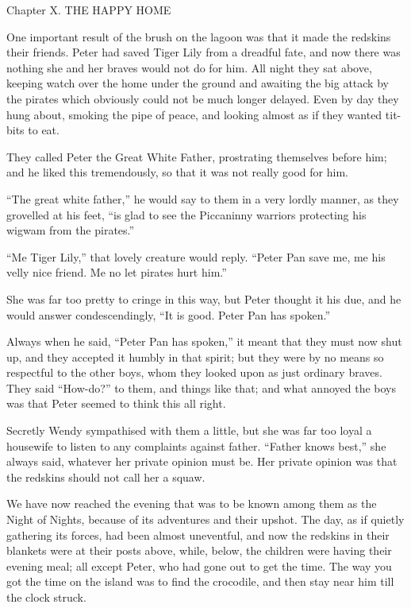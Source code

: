 Chapter X.
THE HAPPY HOME


One important result of the brush on the lagoon was that it made the
redskins their friends. Peter had saved Tiger Lily from a dreadful
fate, and now there was nothing she and her braves would not do for
him. All night they sat above, keeping watch over the home under the
ground and awaiting the big attack by the pirates which obviously could
not be much longer delayed. Even by day they hung about, smoking the
pipe of peace, and looking almost as if they wanted tit-bits to eat.

They called Peter the Great White Father, prostrating themselves before
him; and he liked this tremendously, so that it was not really good for
him.

``The great white father,'' he would say to them in a very lordly manner,
as they grovelled at his feet, ``is glad to see the Piccaninny warriors
protecting his wigwam from the pirates.''

``Me Tiger Lily,'' that lovely creature would reply. ``Peter Pan save me,
me his velly nice friend. Me no let pirates hurt him.''

She was far too pretty to cringe in this way, but Peter thought it his
due, and he would answer condescendingly, ``It is good. Peter Pan has
spoken.''

Always when he said, ``Peter Pan has spoken,'' it meant that they must
now shut up, and they accepted it humbly in that spirit; but they were
by no means so respectful to the other boys, whom they looked upon as
just ordinary braves. They said ``How-do?'' to them, and things like
that; and what annoyed the boys was that Peter seemed to think this all
right.

Secretly Wendy sympathised with them a little, but she was far too
loyal a housewife to listen to any complaints against father. ``Father
knows best,'' she always said, whatever her private opinion must be. Her
private opinion was that the redskins should not call her a squaw.

We have now reached the evening that was to be known among them as the
Night of Nights, because of its adventures and their upshot. The day,
as if quietly gathering its forces, had been almost uneventful, and now
the redskins in their blankets were at their posts above, while, below,
the children were having their evening meal; all except Peter, who had
gone out to get the time. The way you got the time on the island was to
find the crocodile, and then stay near him till the clock struck.

